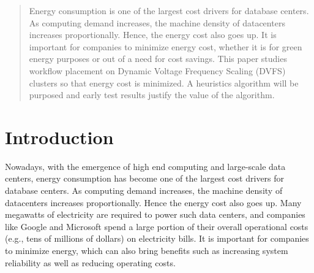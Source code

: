 \documentclass[conference]{IEEEtran}
\begin{document}




\maketitle

\begin{abstract}
Energy consumption is one of the largest cost drivers for database centers. As computing demand increases, the machine density of datacenters increases proportionally. Hence, the energy cost also goes up. It is important for companies to minimize energy cost, whether it is for green energy purposes or out of a need for cost savings. This paper studies workflow placement on Dynamic Voltage Frequency Scaling (DVFS) clusters so that energy cost is minimized. A heuristics algorithm will be purposed and early test results justify the value of the algorithm.
\end{abstract}





%
\IEEEpeerreviewmaketitle


\section{Introduction}
Nowadays, with the emergence of high end computing and large-scale data centers, energy consumption has become one of the largest cost drivers for database centers. As computing demand increases, the machine density of datacenters increases proportionally. Hence the energy cost also goes up. Many megawatts of electricity are required to power such data centers, and companies like Google and Microsoft spend a large portion of their overall operational costs (e.g., tens of millions of dollars) on electricity bills. It is important for companies to minimize energy, which can also bring benefits such as increasing system reliability as well as reducing operating costs.
\end{document}
